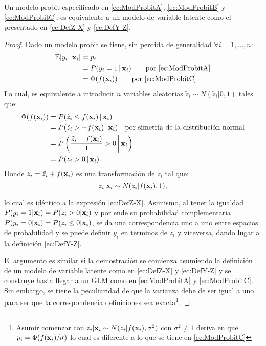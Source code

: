 \documentclass[../Main/Main.tex]{subfiles}
\begin{document}
\begin{theorem}
Un modelo probit especificado en \eqref{ec:ModProbitA}, \eqref{ec:ModProbitB} y \eqref{ec:ModProbitC}, es equivalente a un modelo de variable latente como el presentado en \eqref{ec:DefZ-X} y \eqref{ec:DefY-Z}.
\end{theorem}

\begin{proof} Dado un modelo probit se tiene, sin perdida de generalidad $\forall i = 1,\ldots,n$:
\begin{align*}
	\mathbb{E}[y_i\,|\,\mathbf{x}_i] &= p_i  \\
				&= P(y_i = 1\,|\,\mathbf{x}_i)  \qquad \text{por \eqref{ec:ModProbitA}}\\
				&= \Phi(f(\mathbf{x}_i)) \qquad \text{por \eqref{ec:ModProbitC}}
\end{align*}
Lo cual, es equivalente a introducir $n$ variables aleatorias $\tilde{z}_i \sim N(\tilde{z}_i|0,1)$ tales que:
\begin{align*}
	\Phi(f(\mathbf{x}_i)) 	&= P(\tilde{z}_i \leq f(\mathbf{x}_i)\,|\,\mathbf{x}_i)\\
			      	&= P(\tilde{z}_i > - f(\mathbf{x}_i)\,|\,\mathbf{x}_i) \quad \text{por simetría de la distribución normal}\\
			      	&= P\left(\dfrac{\tilde{z}_i + f(\mathbf{x}_i)}{1} > 0\,\bigg|\,\mathbf{x}_i\right)\\
			      	&= P(z_i > 0\,|\,\mathbf{x}_i).
\end{align*}
Donde $z_i = \tilde{z_i} + f(\mathbf{x}_i)$ es una transformación de $\tilde{z}_i$ tal que: 
$$z_i|\mathbf{x}_i \sim N(z_i|f(\mathbf{x}_i),1),$$ 

lo cual es idéntico a la expresión \eqref{ec:DefZ-X}. Asimismo, al tener la igualdad $P(y_i = 1|\mathbf{x}_i) = P(z_i > 0|\mathbf{x}_i)$ y por ende su probabilidad complementaria $P(y_i = 0|\mathbf{x}_i) = P(z_i \leq 0|\mathbf{x}_i)$, se da una correspondencia uno a uno entre espacios de probabilidad y se puede definir $y_i$ en terminos de $z_i$ y viceversa, dando lugar a la definición \eqref{ec:DefY-Z}. 

El argumento es similar si la demostración se comienza asumiendo la definición de un modelo de variable latente como en \eqref{ec:DefZ-X} y \eqref{ec:DefY-Z} y se construye hasta llegar a un GLM como en  \eqref{ec:ModProbitA} y \eqref{ec:ModProbitC}. Sin embargo, se tiene la peculiaridad de que la varianza debe de ser igual a uno para ser que la correspondencia definiciones sea exacta\footnote{Asumir comenzar con $z_i|\mathbf{x}_i \sim N(z_i|f(\mathbf{x}_i),\sigma^2)$ con $\sigma^2\neq 1$ deriva en que $p_i = \Phi(f(\mathbf{x}_i)/\sigma)$ lo cual es diferente a lo que se tiene en \eqref{ec:ModProbitC}}. 
\end{proof}
\end{document}
